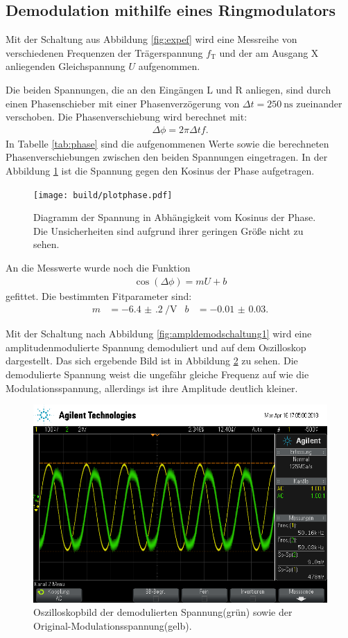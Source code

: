 \subsection{Demodulation mithilfe eines Ringmodulators}

Mit der Schaltung aus Abbildung \ref{fig:expef} wird eine Messreihe von verschiedenen Frequenzen der Trägerspannung $f_\text{T}$ und der am Ausgang X anliegenden Gleichspannung $U$ aufgenommen.

Die beiden Spannungen, die an den Eingängen L und R anliegen, sind durch einen Phasenschieber mit einer Phasenverzögerung von $\Delta t = \SI{250}{\nano\second}$ zueinander verschoben.
Die Phasenverschiebung wird berechnet mit:
\begin{align}
  \Delta \phi = 2\pi \Delta t  f.
\end{align}
In Tabelle \ref{tab:phase} sind die aufgenommenen Werte sowie die berechneten Phasenverschiebungen zwischen den beiden Spannungen eingetragen.
In der Abbildung \ref{fig:plotphase} ist die Spannung gegen den Kosinus der Phase aufgetragen.
\begin{figure}
  \centering
  \texttt{[image: build/plotphase.pdf]}
  \caption{Diagramm der Spannung in Abhängigkeit vom Kosinus der Phase. Die Unsicherheiten sind aufgrund ihrer geringen Größe nicht zu sehen.}
  \label{fig:plotphase}
\end{figure}
An die Messwerte wurde noch die Funktion
\begin{align}
  \cos(\Delta \phi) = m U + b
\end{align}
gefittet. Die bestimmten Fitparameter sind:
\begin{align*}
  m &= \SI{-6.4(2)}{\per\volt} & b &= \num{-0.01(3)}.
\end{align*}

Mit der Schaltung nach Abbildung \ref{fig:ampldemodschaltung1} wird eine amplitudenmodulierte Spannung demoduliert und auf dem Oszilloskop dargestellt. Das sich ergebende Bild ist in Abbildung \ref{fig:demodRing} zu sehen. Die demodulierte Spannung weist die ungefähr gleiche Frequenz auf wie die Modulationsspannung, allerdings ist ihre Amplitude deutlich kleiner.
\begin{figure}[h]
  \centering
  \includegraphics[width=.9\textwidth]{Oszi_Pics/demodRing.png}
  \caption{Oszilloskopbild der demodulierten Spannung(grün) sowie der Original-Modulationsspannung(gelb).}
  \label{fig:demodRing}
\end{figure}


